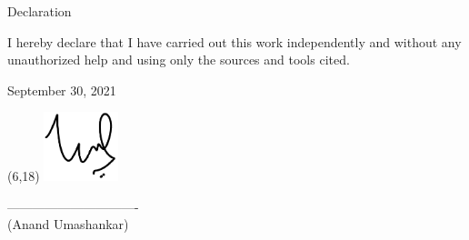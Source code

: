 
{\LARGE Declaration}

\vspace*{\fill}

I hereby declare that I have carried out this work independently and without any unauthorized help and using only the sources and tools cited.

\vspace*{\fill}

September 30, 2021

\vspace*{\fill}
\begin{textblock}{10}(6,18)
\raggedleft\noindent\includegraphics[height=2cm]{images/sign.pdf}
\end{textblock}
\begin{flushright}
------------------------------- \\
(Anand Umashankar)
\end{flushright}
\vspace*{\fill}
\newpage